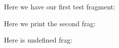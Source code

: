 \documentclass{book}
\begin{document}
Here we have our first test fragment:\\


Here we print the second frag:\\ 


Here is undefined frag:\\  
\end{document}
